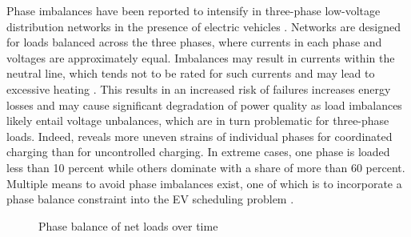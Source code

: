 Phase imbalances have been reported to intensify in three-phase low-voltage distribution networks in the presence of electric vehicles \cite{Ul-Haq2015}. Networks are designed for loads balanced across the three phases, where currents in each phase and voltages are approximately equal. Imbalances may result in currents within the neutral line, which tends not to be rated for such currents and may lead to excessive heating \cite{Bass2013a}. This results in an increased risk of failures increases energy losses and may cause significant degradation of power quality \cite{Sun2015} as load imbalances likely entail voltage unbalances, which are in turn problematic for three-phase loads. Indeed,  reveals more uneven strains of individual phases for coordinated charging than for uncontrolled charging. In extreme cases, one phase is loaded less than 10 percent while others dominate with a share of more than 60 percent. Multiple means to avoid phase imbalances exist, one of which is to incorporate a phase balance constraint into the EV scheduling problem \cite{Putrus2009,Sun2015}. %

\begin{figure}[]
	\centering
	\hfill
	\caption{Phase balance of net loads over time}
	\label{fig:phasebalance}
\end{figure}

